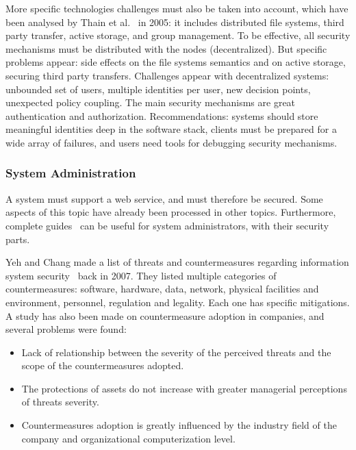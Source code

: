 More specific technologies challenges must also be taken into account, which have been analysed by Thain et al.~\cite{thain_consequences_2005} in 2005: it includes distributed file systems, third party transfer, active storage, and group management. To be effective, all security mechanisms must be distributed with the nodes (decentralized). But specific problems appear: side effects on the file systems semantics and on active storage, securing third party transfers. Challenges appear with decentralized systems: unbounded set of users, multiple identities per user, new decision points, unexpected policy coupling. The main security mechanisms are great authentication and authorization. Recommendations: systems should store meaningful identities deep in the software stack, clients must be prepared for a wide array of failures, and users need tools for debugging security mechanisms. %

\subsubsection{System Administration}
\label{subsubsec:state_review_results_systemadministration}

A system must support a web service, and must therefore be secured. Some aspects of this topic have already been processed in other topics. Furthermore, complete guides~\cite{frisch_essential_2002}\cite{white_computer_2017} can be useful for system administrators, with their security parts.

Yeh and Chang made a list of threats and countermeasures regarding information system security~\cite{yeh_threats_2007} back in 2007. They listed multiple categories of countermeasures: software, hardware, data, network, physical facilities and environment, personnel, regulation and legality. Each one has specific mitigations. A study has also been made on countermeasure adoption in companies, and several problems were found:
\begin{itemize}
	\item Lack of relationship between the severity of the perceived threats and the scope of the countermeasures adopted. %
	\item The protections of assets do not increase with greater managerial perceptions of threats severity. %
	\item Countermeasures adoption is greatly influenced by the industry field of the company and organizational computerization level. %
\end{itemize}

